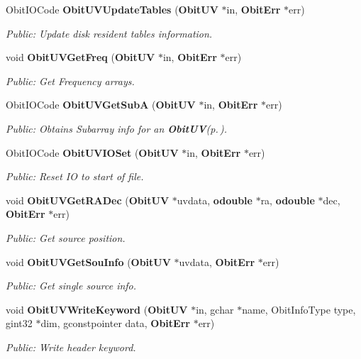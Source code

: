 \begin{CompactItemize}
Obit\-IOCode {\bf Obit\-UVUpdate\-Tables} ({\bf Obit\-UV} $\ast$in, {\bf Obit\-Err} $\ast$err)
\begin{CompactList}\small\item\em Public: Update disk resident tables information. \item\end{CompactList}\item 
void {\bf Obit\-UVGet\-Freq} ({\bf Obit\-UV} $\ast$in, {\bf Obit\-Err} $\ast$err)
\begin{CompactList}\small\item\em Public: Get Frequency arrays. \item\end{CompactList}\item 
Obit\-IOCode {\bf Obit\-UVGet\-Sub\-A} ({\bf Obit\-UV} $\ast$in, {\bf Obit\-Err} $\ast$err)
\begin{CompactList}\small\item\em Public: Obtains Subarray info for an {\bf Obit\-UV}{\rm (p.\,\pageref{structObitUV})}. \item\end{CompactList}\item 
Obit\-IOCode {\bf Obit\-UVIOSet} ({\bf Obit\-UV} $\ast$in, {\bf Obit\-Err} $\ast$err)
\begin{CompactList}\small\item\em Public: Reset IO to start of file. \item\end{CompactList}\item 
void {\bf Obit\-UVGet\-RADec} ({\bf Obit\-UV} $\ast$uvdata, {\bf odouble} $\ast$ra, {\bf odouble} $\ast$dec, {\bf Obit\-Err} $\ast$err)
\begin{CompactList}\small\item\em Public: Get source position. \item\end{CompactList}\item 
void {\bf Obit\-UVGet\-Sou\-Info} ({\bf Obit\-UV} $\ast$uvdata, {\bf Obit\-Err} $\ast$err)
\begin{CompactList}\small\item\em Public: Get single source info. \item\end{CompactList}\item 
void {\bf Obit\-UVWrite\-Keyword} ({\bf Obit\-UV} $\ast$in, gchar $\ast$name, Obit\-Info\-Type type, gint32 $\ast$dim, gconstpointer data, {\bf Obit\-Err} $\ast$err)
\begin{CompactList}\small\item\em Public: Write header keyword. \item\end{CompactList}\item 

\end{CompactItemize}
